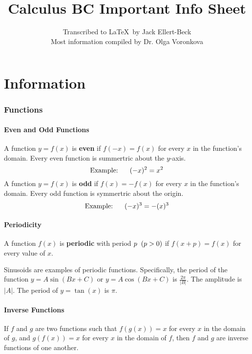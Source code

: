 \documentclass{artikel3}
\begin{document}
\title{Calculus BC Important Info Sheet}
\author{Transcribed to \LaTeX\ by Jack Ellert-Beck\\ 
Most information compiled by Dr. Olga Voronkova}
\maketitle

\newpage

\tableofcontents

\newpage

\part{Information}

\section{Functions}

\subsection{Even and Odd Functions}
A function $y=f(x)$ is \textbf{even} if $f(-x)=f(x)$ for every $x$ 
in the function's domain. Every even function is summertric about 
the $y$-axis. \[\text{Example:}\hspace{6 mm} (-x)^2=x^2 \]
A function $y=f(x)$ is \textbf{odd} if $f(x)=-f(x)$ for every $x$ 
in the function's domain. Every odd function is symmertric about 
the origin. \[\text{Example:}\hspace{6 mm} (-x)^3=-(x)^3 \]

\subsection{Periodicity}
A function $f(x)$ is \textbf{periodic} with period $p\hspace{2 mm}(p>0)$ if 
$f(x+p)=f(x)$ for every value of $x$.

Sinusoids are examples of periodic functions. Specifically, the period
of the function $y=A\sin(Bx+C)$ or $y=A\cos(Bx+C)$ is $\frac{2\pi}{|B|}$.
The amplitude is $|A|$. The period of $y=\tan(x)$ is $\pi$.

\subsection{Inverse Functions}
If $f$ and $g$ are two functions such that $f(g(x))=x$ for every $x$ in 
the domain of $g$, and $g(f(x))=x$ for every $x$ in the domain of $f$, then
$f$ and $g$ are inverse functions of one another.
\end{document}
